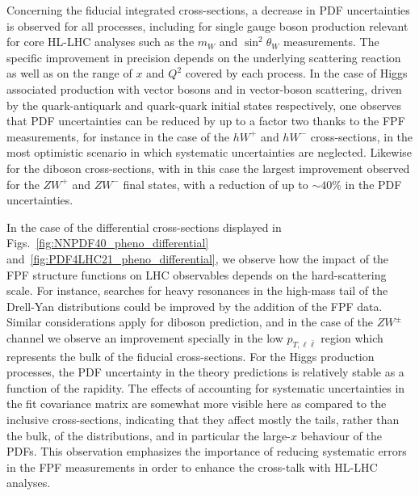 Concerning the fiducial integrated cross-sections, a decrease in PDF
uncertainties is observed for all processes,
including for single gauge boson production relevant for core
HL-LHC analyses such as the $m_W$ and $\sin^2\theta_W$ measurements.
%
The specific improvement in precision depends
on the underlying scattering reaction as well as on the range
of $x$ and $Q^2$ covered by each process.
%
In the case of  Higgs associated production with vector bosons and in vector-boson
scattering,
driven by the quark-antiquark and quark-quark initial states respectively,
one observes that PDF uncertainties can  be reduced
by up to a factor two thanks to the FPF measurements, for instance
in the case of the $hW^+$ and $hW^-$ cross-sections,
in the most optimistic scenario in which systematic uncertainties
are neglected.
%
Likewise for the diboson cross-sections, with in this case the largest
improvement observed for the $ZW^+$  and  $ZW^-$ final states, with a reduction
of up to $\sim 40\%$ in the PDF uncertainties.

In the case of the differential cross-sections displayed in Figs.~\ref{fig:NNPDF40_pheno_differential}
and~\ref{fig:PDF4LHC21_pheno_differential},
we observe how the impact of the FPF structure functions on LHC observables depends
on the hard-scattering scale.
%
For instance, searches for heavy resonances in the high-mass tail of the Drell-Yan
distributions could be improved by the addition of the FPF data.
%
Similar considerations apply for diboson prediction, and in the case of the $ZW^{\pm}$ channel we observe
an improvement specially in the low $p_{T,\ell\bar{\ell}}$ region which
represents the bulk of the fiducial cross-sections.
%
For the Higgs production processes, the PDF uncertainty in the theory predictions is relatively
stable as a function of the rapidity.
%
The effects of accounting for systematic uncertainties in the fit covariance
matrix are somewhat more visible here as compared to the inclusive cross-sections,
indicating that they affect mostly
the tails, rather than the bulk, of the distributions, and in particular the large-$x$
behaviour of the PDFs.
%
This observation emphasizes the importance of reducing systematic errors
in the FPF measurements in order to enhance the cross-talk with HL-LHC analyses.


